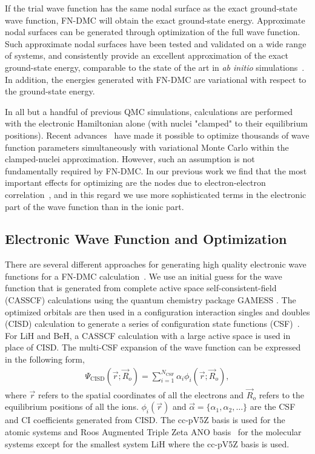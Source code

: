 \documentclass[pra,superscriptaddress,groupedaddress,twocolumn]{revtex4}
\begin{document}
If the trial wave function has the same nodal surface as the exact ground-state wave function, FN-DMC will obtain the exact ground-state energy.  Approximate nodal surfaces can be generated through optimization of the full wave function. Such approximate nodal surfaces have been tested and validated on a wide range of systems, and consistently provide an excellent approximation of the exact ground-state energy,  comparable to the state of the art in \textit{ab initio} simulations~\cite{grossman1}. In addition, the energies generated with FN-DMC are variational with respect to the ground-state energy.

In all but a handful of previous QMC simulations, calculations are performed with the electronic Hamiltonian alone (with nuclei "clamped" to their equilibrium positions). Recent advances~\cite{Nightingale_Linear,Umrigar_Linear,Brown_Bench} have made it possible to optimize thousands of wave function parameters simultaneously with variational Monte Carlo within the clamped-nuclei approximation. However, such an assumption is not fundamentally required by FN-DMC. In our previous work we find that the most important effects for optimizing are the nodes due to electron-electron correlation~\cite{Tubman_ECG}, and in this regard we use more sophisticated terms in the electronic part of the wave function than in the ionic part.

\subsection{Electronic Wave Function and Optimization}

There are several different approaches for generating high quality electronic wave functions for a FN-DMC calculation~\cite{Umrigar_Alleviation,Toulouse_Bench,Brown_Bench,Seth_Bench}. We use an initial guess for the wave function that is generated from complete active space self-consistent-field (CASSCF) \cite{Chaban_MCSCF,Szabo} calculations using the quantum chemistry package GAMESS \cite{GAMESS}. The optimized orbitals are then used in a configuration interaction singles and doubles (CISD) calculation to generate a series of configuration state functions (CSF)~\cite{Clark_Bench}. For LiH and BeH, a CASSCF calculation with a large active space is used in place of CISD. The multi-CSF expansion of the wave function can be expressed in the following form,
\begin{align}
\Psi_{\text{CISD}}(\vec{r};\vec{R}_o)=\sum\limits_{i=1}^{N_{\text{CSF}}}\alpha_i\phi_i(\vec{r};\vec{R}_o), \label{eq:psi_gms}
\end{align}
where $\vec{r}$ refers to the spatial coordinates of all the electrons and $\vec{R}_o$ refers to the equilibrium positions of all the ions. $\phi_i(\vec{r})$ and $\vec{\alpha}=\{\alpha_1,\alpha_2,\dots\}$ are the CSF and CI coefficients generated from CISD. The cc-pV5Z basis \cite{dunning} is used for the atomic systems and Roos Augmented Triple Zeta ANO basis~\cite{roos} for the molecular systems except for the smallest system LiH where the cc-pV5Z basis is used. 
\end{document}
